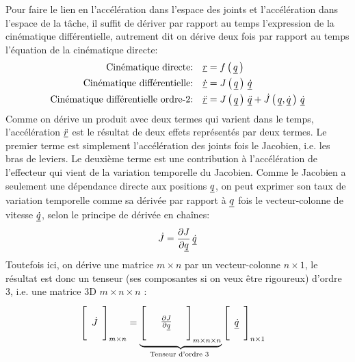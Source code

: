Pour faire le lien en l'accélération dans l'espace des joints et l'accélération dans l'espace de la tâche, il suffit de dériver par rapport au temps l'expression de la cinématique différentielle, autrement dit on dérive deux fois par rapport au temps l'équation de la cinématique directe:
\begin{align}
\text{Cinématique directe:}  \quad \underline{r} &= f\left( \, \underline{q} \, \right) \\
\text{Cinématique différentielle:} \quad \underline{\dot{r}} &= J\left( \, \underline{q} \, \right) \, \underline{\dot{q}} \\
\text{Cinématique différentielle ordre-2:} \quad \underline{\ddot{r}} &= J\left( \, \underline{q} \, \right) \, \underline{\ddot{q}}  + \dot{J} \left( \, \underline{q}  , \underline{\dot{q}} \, \right) \, \underline{\dot{q}} 
\label{eq:ddj}
\end{align}
Comme on dérive un produit avec deux termes qui varient dans le temps, l'accélération $\underline{\ddot{r}}$ est le résultat de deux effets représentés par deux termes. Le premier terme est simplement l'accélération des joints fois le Jacobien, i.e. les bras de leviers. Le deuxième terme est une contribution à l'accélération de l'effecteur qui vient de la variation temporelle du Jacobien. Comme le Jacobien a seulement une dépendance directe aux positions $\underline{q}$, on peut exprimer son taux de variation temporelle comme sa dérivée par rapport à $\underline{q}$ fois le vecteur-colonne de vitesse $\underline{\dot{q}}$, selon le principe de dérivée en chaînes:
\begin{align}
\dot{J} = \frac{ \partial J}{\partial \underline{q}} \, \underline{\dot{q}} 
\end{align}
Toutefois ici, on dérive une matrice $m \times n$ par un vecteur-colonne $n \times 1$, le résultat est donc un tenseur (ses composantes si on veux être rigoureux) d'ordre 3, i.e. une matrice 3D $m \times n \times n$ :
\begin{align}
\left[ \begin{array}{c}  \\ \dot{J} \\ \\
\end{array} \right]_{m \times n}
&= 
\underbrace{
\left[ \begin{array}{c c c} 
&&\\
& \frac{ \partial J}{\partial \underline{q}} &\\
&&
\end{array} \right]_{m \times n \times n}}_{\text{Tenseur d'ordre 3
}}
\left[ \begin{array}{c} 
\\ \underline{\dot{q}} \\ \\
\end{array} \right]_{n \times 1}
\label{eq:jdot}
\end{align}

